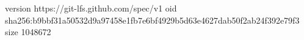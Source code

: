 version https://git-lfs.github.com/spec/v1
oid sha256:b9bbf31a50532d9a97458e1fb7e6bf4929b5d63e4627dab50f2ab24f392e79f3
size 1048672
